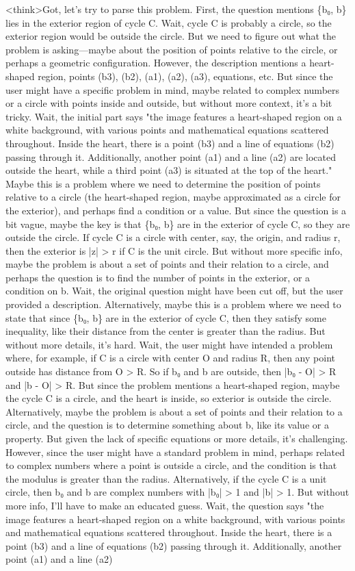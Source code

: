 <think>Got, let's try to parse this problem. First, the question mentions \{b₀, b\} lies in the exterior region of cycle C. Wait, cycle C is probably a circle, so the exterior region would be outside the circle. But we need to figure out what the problem is asking—maybe about the position of points relative to the circle, or perhaps a geometric configuration. However, the description mentions a heart-shaped region, points (b3), (b2), (a1), (a2), (a3), equations, etc. But since the user might have a specific problem in mind, maybe related to complex numbers or a circle with points inside and outside, but without more context, it's a bit tricky. Wait, the initial part says "the image features a heart-shaped region on a white background, with various points and mathematical equations scattered throughout. Inside the heart, there is a point (b3) and a line of equations (b2) passing through it. Additionally, another point (a1) and a line (a2) are located outside the heart, while a third point (a3) is situated at the top of the heart." Maybe this is a problem where we need to determine the position of points relative to a circle (the heart-shaped region, maybe approximated as a circle for the exterior), and perhaps find a condition or a value. But since the question is a bit vague, maybe the key is that \{b₀, b\} are in the exterior of cycle C, so they are outside the circle. If cycle C is a circle with center, say, the origin, and radius r, then the exterior is |z| > r if C is the unit circle. But without more specific info, maybe the problem is about a set of points and their relation to a circle, and perhaps the question is to find the number of points in the exterior, or a condition on b. Wait, the original question might have been cut off, but the user provided a description. Alternatively, maybe this is a problem where we need to state that since \{b₀, b\} are in the exterior of cycle C, then they satisfy some inequality, like their distance from the center is greater than the radius. But without more details, it's hard. Wait, the user might have intended a problem where, for example, if C is a circle with center O and radius R, then any point outside has distance from O > R. So if b₀ and b are outside, then |b₀ - O| > R and |b - O| > R. But since the problem mentions a heart-shaped region, maybe the cycle C is a circle, and the heart is inside, so exterior is outside the circle. Alternatively, maybe the problem is about a set of points and their relation to a circle, and the question is to determine something about b, like its value or a property. But given the lack of specific equations or more details, it's challenging. However, since the user might have a standard problem in mind, perhaps related to complex numbers where a point is outside a circle, and the condition is that the modulus is greater than the radius. Alternatively, if the cycle C is a unit circle, then b₀ and b are complex numbers with |b₀| > 1 and |b| > 1. But without more info, I'll have to make an educated guess. Wait, the question says "the image features a heart-shaped region on a white background, with various points and mathematical equations scattered throughout. Inside the heart, there is a point (b3) and a line of equations (b2) passing through it. Additionally, another point (a1) and a line (a2) 